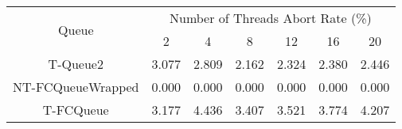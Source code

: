 \begin{tabular}{|c|c|c|c|c|c|c|}
\hline
\multirow{2}{*}{Queue} & \multicolumn{6}{c|}{Number of Threads Abort Rate (\%)}\\\cline{2-7}& 2 & 4 & 8 & 12 & 16 & 20\\
\hline
\hline
T-Queue2 & 3.077 & 2.809 & 2.162 & 2.324 & 2.380 & 2.446\\
NT-FCQueueWrapped & 0.000 & 0.000 & 0.000 & 0.000 & 0.000 & 0.000\\
T-FCQueue & 3.177 & 4.436 & 3.407 & 3.521 & 3.774 & 4.207\\
\hline\end{tabular}
